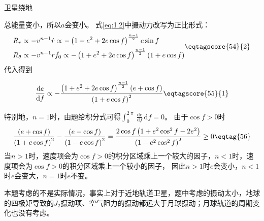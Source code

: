 \documentclass[answer]{cphos}
\begin{document}
\begin{problem}[50]{卫星绕地}
\begin{solution}
总能量变小，所以$a$会变小。
式\ref{eq:1.2}中摄动力改写为正比形式：
\begin{equation}
	\begin{aligned}
		& R_r\propto -v^{n-1}\dot{r} \propto -\left(1+e^2+2e\cos f\right)^{\frac{n-1}{2}}e\sin f\\
		& R_\theta \propto -v^{n-1}r\dot{f}_0 \propto -\left(1+e^2+2e\cos f\right)^{\frac{n-1}{2}}\left(1+e\cos f\right) 
	\end{aligned}
	\eqtagscore{54}{2}
\end{equation}
代入得到

\begin{equation}
	\frac{\mathrm{d}e}{\mathrm{d}f}\propto-\frac{\left(1+e^2+2e\cos f\right)^{\frac{n-1}{2}}\left(e+\cos f\right)}{\left(1+e\cos f\right)^2} \eqtagscore{55}{1}
\end{equation}

特别地，$n=1$时，由题给积分式可得$\int_{0}^{2\uppi} \frac{\mathrm{d}e}{\mathrm{d}f}\,\mathrm{d}f=0$。
由于$\cos f>0$时
\begin{equation}
	\frac{\left(e+\cos f\right)}{\left(1+e\cos f\right)^2}-\frac{\left(e-\cos f\right)}{\left(1-e\cos f\right)^2}=\frac{2\cos f\left(1+e^2\cos^2 f-2e^2\right)}{\left(1-e^2\cos^2 f\right)^2}\geq0 \eqtag{56}
\end{equation}
当$n>1$时，速度项会为$\cos f>0$的积分区域乘上一个较大的因子，$n<1$时，速度项会为$\cos f>0$的积分区域乘上一个较小的因子，
因此$n>1$时$e$会变小，$n<1$时$e$会变大，$n=1$时$e$不变。

\scoring

\begin{problemappendix}
	本题考虑的不是实际情况，事实上对于近地轨道卫星，题中考虑的摄动太小，地球的四极矩导致的$J_2$摄动项、空气阻力的摄动都远大于月球摄动；月球轨道的周期变化也没有考虑。
\end{problemappendix}

\end{solution}

\end{problem}
\end{document}
